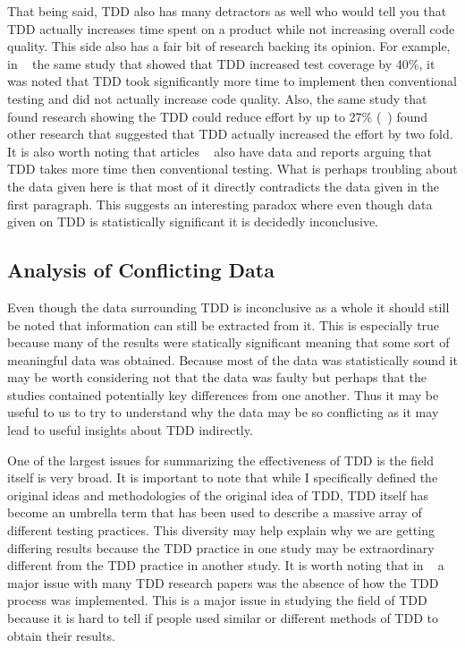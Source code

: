 \documentclass{sig-alternate}
\begin{document}
That being said, TDD also has many detractors as well who would tell you that TDD actually increases time spent on a product while not increasing overall code quality. This side also has a fair bit of research backing its opinion.  For example, in ~\cite{Lemos:2012} the same study that showed that TDD increased test coverage by 40\%, it was noted that TDD took significantly more time to implement then conventional testing and did not actually increase code quality. Also, the same study that found research showing the TDD could reduce effort by up to 27\% (~\cite{Hellman:2012}) found other research that suggested that TDD actually increased the effort by two fold. It is also worth noting that articles ~\cite{Hammond:2012, Kettunen:2010} also have data and reports arguing that TDD takes more time then conventional testing.  What is perhaps troubling about the data given here is that most of it directly contradicts the data given in the first paragraph.  This suggests an interesting paradox where even though data given on TDD is statistically significant it is decidedly inconclusive. 

\subsection{Analysis of Conflicting Data}
Even though the data surrounding TDD is inconclusive as a whole it should still be noted that information can still be extracted from it.  This is especially true because many of the results were statically significant meaning that some sort of meaningful data was obtained.   
Because most of the data was statistically sound it may be worth considering not that the data was faulty but perhaps that the studies contained potentially key differences from one another.  Thus it may be useful to us to try to understand why the data may be so conflicting as it may lead to useful insights about TDD indirectly.

One of the largest issues for summarizing the effectiveness of TDD is the field itself is very broad.  It is important to note that while I specifically defined the original ideas and methodologies of the original idea of TDD, TDD itself has become an umbrella term that has been used to describe a massive array of different testing practices.  This diversity may help explain why we are getting differing results because the TDD practice in one study may be extraordinary different from the TDD practice in another study.  It is worth noting that in ~\cite{Hammond:2012} a major issue with many TDD research papers was the absence of how the TDD process was implemented. This is a major issue in studying the field of TDD because it is hard to tell if people used similar or different methods of TDD to obtain their results.
\end{document}
